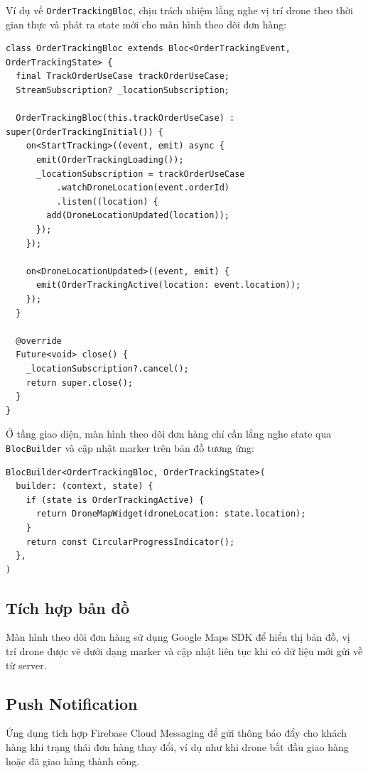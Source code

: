 Ví dụ về \texttt{OrderTrackingBloc}, chịu trách nhiệm lắng nghe vị trí drone theo thời gian thực và phát ra state mới cho màn hình theo dõi đơn hàng:

\begin{verbatim}
class OrderTrackingBloc extends Bloc<OrderTrackingEvent, OrderTrackingState> {
  final TrackOrderUseCase trackOrderUseCase;
  StreamSubscription? _locationSubscription;

  OrderTrackingBloc(this.trackOrderUseCase) : super(OrderTrackingInitial()) {
    on<StartTracking>((event, emit) async {
      emit(OrderTrackingLoading());
      _locationSubscription = trackOrderUseCase
          .watchDroneLocation(event.orderId)
          .listen((location) {
        add(DroneLocationUpdated(location));
      });
    });

    on<DroneLocationUpdated>((event, emit) {
      emit(OrderTrackingActive(location: event.location));
    });
  }

  @override
  Future<void> close() {
    _locationSubscription?.cancel();
    return super.close();
  }
}
\end{verbatim}

Ở tầng giao diện, màn hình theo dõi đơn hàng chỉ cần lắng nghe state qua \texttt{BlocBuilder} và cập nhật marker trên bản đồ tương ứng:

\begin{verbatim}
BlocBuilder<OrderTrackingBloc, OrderTrackingState>(
  builder: (context, state) {
    if (state is OrderTrackingActive) {
      return DroneMapWidget(droneLocation: state.location);
    }
    return const CircularProgressIndicator();
  },
)
\end{verbatim}

\subsection{Tích hợp bản đồ}

Màn hình theo dõi đơn hàng sử dụng Google Maps SDK để hiển thị bản đồ, vị trí drone được vẽ dưới dạng marker và cập nhật liên tục khi có dữ liệu mới gửi về từ server.

\subsection{Push Notification}

Ứng dụng tích hợp Firebase Cloud Messaging để gửi thông báo đẩy cho khách hàng khi trạng thái đơn hàng thay đổi, ví dụ như khi drone bắt đầu giao hàng hoặc đã giao hàng thành công.

